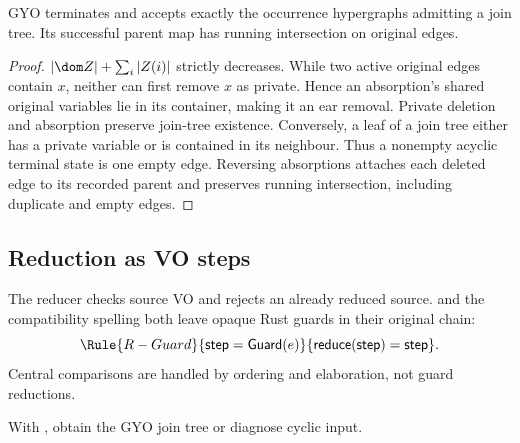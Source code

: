 \begin{theorem}
GYO terminates and accepts exactly the occurrence hypergraphs admitting a join
tree. Its successful parent map has running intersection on original edges.
\end{theorem}
\begin{proof}
$|\dom Z|+\sum_i|Z(i)|$ strictly decreases. While two active original edges
contain $x$, neither can first remove $x$ as private. Hence an absorption's
shared original variables lie in its container, making it an ear removal.
Private deletion and absorption preserve join-tree existence. Conversely, a
leaf of a join tree either has a private variable or is contained in its
neighbour. Thus a nonempty acyclic terminal state is one empty edge. Reversing
absorptions attaches each deleted edge to its recorded parent and preserves
running intersection, including duplicate and empty edges.
\end{proof}

\subsection{Reduction as VO steps}
\label{sec:yannakakis}
The reducer checks source VO and rejects an already reduced source.
 and the compatibility spelling 
both leave opaque Rust guards in their original chain:
\[
\Rule{R-Guard}{\mathsf{step}=\mathsf{Guard}(e)}
 {\mathsf{reduce}(\mathsf{step})=\mathsf{step}}.
\]
Central comparisons are handled by ordering and elaboration, not guard
reductions.

With , obtain the GYO
join tree or diagnose cyclic input.

